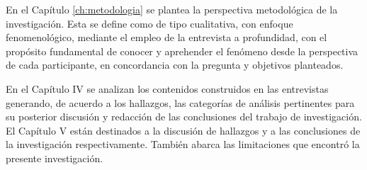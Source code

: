 En el Capítulo \ref{ch:metodologia} se plantea la perspectiva
metodológica de la
investigación.
Esta se define como de tipo cualitativa, con enfoque fenomenológico, mediante el
empleo de la entrevista a profundidad, con el propósito fundamental de conocer y
aprehender el fenómeno desde la perspectiva de cada participante, en
concordancia con la pregunta y objetivos planteados.

En el Capítulo IV se analizan los contenidos construidos en las entrevistas
generando, de acuerdo a los hallazgos, las categorías de análisis pertinentes
para su posterior discusión y redacción de las conclusiones del trabajo de
investigación.
El Capítulo V están destinados a la discusión de hallazgos y a las
conclusiones de la investigación respectivamente.
También abarca las limitaciones que encontró la presente investigación.
